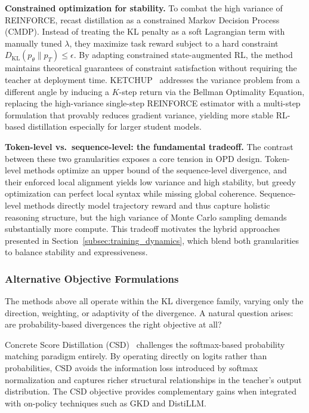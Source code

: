 \documentclass{article} %
\newcommand{\KL}{D_{\mathrm{KL}}}
\newcommand{\ptheta}{p_\theta}
\newcommand{\pteacher}{p_T}
\begin{document}
\textbf{Constrained optimization for stability.}
To combat the high variance of REINFORCE, \citet{2509.22921} recast distillation as a constrained Markov Decision Process (CMDP). Instead of treating the KL penalty as a soft Lagrangian term with manually tuned $\lambda$, they maximize task reward subject to a hard constraint $\KL(\ptheta \parallel \pteacher) \le \epsilon$. By adapting constrained state-augmented RL, the method maintains theoretical guarantees of constraint satisfaction without requiring the teacher at deployment time. KETCHUP~\citep{2504.19024} addresses the variance problem from a different angle by inducing a $K$-step return via the Bellman Optimality Equation, replacing the high-variance single-step REINFORCE estimator with a multi-step formulation that provably reduces gradient variance, yielding more stable RL-based distillation especially for larger student models.

\textbf{Token-level vs.\ sequence-level: the fundamental tradeoff.}
The contrast between these two granularities exposes a core tension in OPD design. Token-level methods optimize an upper bound of the sequence-level divergence, and their enforced local alignment yields low variance and high stability, but greedy optimization can perfect local syntax while missing global coherence. Sequence-level methods directly model trajectory reward and thus capture holistic reasoning structure, but the high variance of Monte Carlo sampling demands substantially more compute. This tradeoff motivates the hybrid approaches presented in Section~\ref{subsec:training_dynamics}, which blend both granularities to balance stability and expressiveness.


\subsubsection{Alternative Objective Formulations}

The methods above all operate within the KL divergence family, varying only the direction, weighting, or adaptivity of the divergence. A natural question arises: are probability-based divergences the right objective at all?

Concrete Score Distillation (CSD)~\citep{2509.25837} challenges the softmax-based probability matching paradigm entirely. By operating directly on logits rather than probabilities, CSD avoids the information loss introduced by softmax normalization and captures richer structural relationships in the teacher's output distribution. The CSD objective provides complementary gains when integrated with on-policy techniques such as GKD and DistiLLM.
\end{document}

